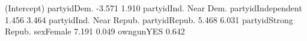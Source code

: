 \begin{Schunk}
\begin{Soutput}
            (Intercept)             partyidDem. 
                 -3.571                   1.910 
  partyidInd. Near Dem.      partyidIndependent 
                  1.456                   3.464 
partyidInd. Near Repub.           partyidRepub. 
                  5.468                   6.031 
   partyidStrong Repub.               sexFemale 
                  7.191                   0.049 
              owngunYES 
                  0.642 
\end{Soutput}
\end{Schunk}
